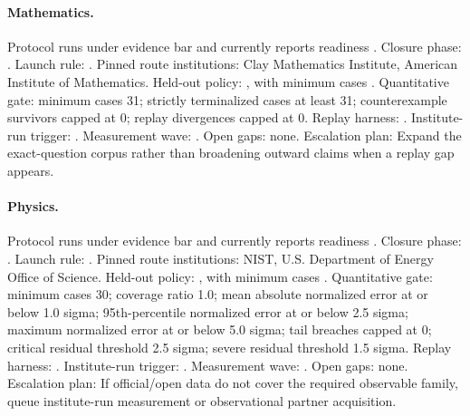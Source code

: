 \paragraph{Mathematics.}
Protocol  runs under evidence bar  and currently reports readiness .
Closure phase: . Launch rule: .
Pinned route institutions: Clay Mathematics Institute, \allowbreak American Institute of Mathematics.
Held-out policy: , with minimum cases .
Quantitative gate: minimum cases 31; strictly terminalized cases at least 31; counterexample survivors capped at 0; replay divergences capped at 0.
Replay harness: .
Institute-run trigger: . Measurement wave: .
Open gaps: none.
Escalation plan: Expand the exact-question corpus rather than broadening outward claims when a replay gap appears.

\paragraph{Physics.}
Protocol  runs under evidence bar  and currently reports readiness .
Closure phase: . Launch rule: .
Pinned route institutions: NIST, \allowbreak U.S. Department of Energy Office of Science.
Held-out policy: , with minimum cases .
Quantitative gate: minimum cases 30; coverage ratio 1.0; mean absolute normalized error at or below 1.0 sigma; 95th-percentile normalized error at or below 2.5 sigma; maximum normalized error at or below 5.0 sigma; tail breaches capped at 0; critical residual threshold 2.5 sigma; severe residual threshold 1.5 sigma.
Replay harness: .
Institute-run trigger: . Measurement wave: .
Open gaps: none.
Escalation plan: If official/open data do not cover the required observable family, queue institute-run measurement or observational partner acquisition.

